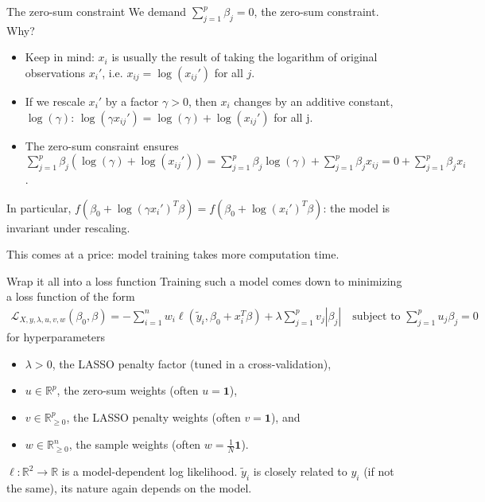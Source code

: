 \documentclass[10pt, aspectratio=169]{beamer}
\def\RR{\mathbb{R}}
\begin{document}
\begin{frame}{The zero-sum constraint}
  We demand $\sum_{j=1}^p \beta_j = 0$, the zero-sum constraint. Why?

  \begin{itemize}
    \item Keep in mind: $x_i$ is usually the result of taking the logarithm of original 
      observations $x_i'$, i.e. $x_{ij} = \log(x_{ij}')$ for all $j$.
    \item If we rescale $x_i'$ by a factor $\gamma > 0$, then $x_i$ changes by an additive 
      constant, $\log(\gamma)$: $\log(\gamma x_{ij}') = \log(\gamma) + \log(x_{ij}')$ for all j.
    \item The zero-sum consraint ensures $\sum_{j=1}^p \beta_j (\log(\gamma) + \log(x_{ij}')) = 
      \sum_{j=1}^p \beta_j \log(\gamma) + \sum_{j=1}^p \beta_j x_{ij} = 0 + \sum_{j=1}^p 
      \beta_j x_i$. 
  \end{itemize}
  
  In particular, $f(\beta_0 + \log(\gamma x_i')^T \beta) = f(\beta_0 + \log(x_i')^T \beta)$: the 
  model is \alert{invariant under rescaling}.

  This comes at a price: model training takes more computation time.
\end{frame}

\begin{frame}{Wrap it all into a loss function}
  Training such a model comes down to minimizing a loss function of the form 
  \begin{align}
    \mathcal{L}_{X, y, \lambda, u, v, w}(\beta_0, \beta) = -\sum_{i=1}^n w_i 
    \ell(\tilde{y}_i, \beta_0 + x_i^T \beta) + \lambda \sum_{j=1}^p v_j |\beta_j| 
    \quad \text{subject to } \sum_{j=1}^p u_j \beta_j = 0
  \end{align}
  for hyperparameters 
  \begin{itemize}
    \item $\lambda > 0$, the LASSO penalty factor (tuned in a cross-validation),
    \item $u \in \RR^p$, the zero-sum weights (often $u = \mathbf{1}$),
    \item $v \in \RR^p_{\geq 0}$, the LASSO penalty weights (often $v = \mathbf{1}$), and
    \item $w \in \RR^n_{\geq 0}$, the sample weights (often $w = \frac{1}{N} \mathbf{1}$).
  \end{itemize}

  $\ell: \RR^2 \to \RR$ is a model-dependent log likelihood. $\tilde{y}_i$ is closely 
  related to $y_i$ (if not the same), its nature again depends on the model.
\end{frame}
\end{document}
